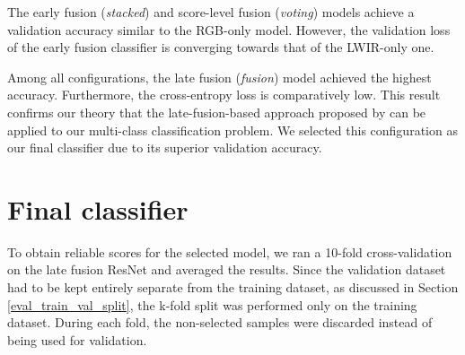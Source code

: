 \documentclass{l4proj}
\begin{document}
The early fusion (\textit{stacked}) and score-level fusion (\textit{voting}) models achieve a validation accuracy similar to the RGB-only model. However, the validation loss of the early fusion classifier is converging towards that of the LWIR-only one.

Among all configurations, the late fusion (\textit{fusion}) model achieved the highest accuracy. Furthermore, the cross-entropy loss is comparatively low. This result confirms our theory that the late-fusion-based approach proposed by \citet{wagner_multispectral_2016} can be applied to our multi-class classification problem. We selected this configuration as our final classifier due to its superior validation accuracy. 


\section{Final classifier}
\label{eval_final}

To obtain reliable scores for the selected model, we ran a 10-fold cross-validation on the late fusion ResNet and averaged the results. Since the validation dataset had to be kept entirely separate from the training dataset, as discussed in Section \ref{eval_train_val_split}, the k-fold split was performed only on the training dataset. During each fold, the non-selected samples were discarded instead of being used for validation.
\end{document}
